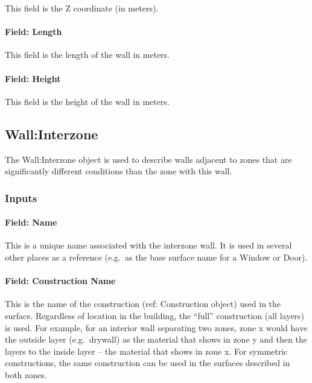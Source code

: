 This field is the Z coordinate (in meters).

\paragraph{Field: Length}\label{field-length-2}

This field is the length of the wall in meters.

\paragraph{Field: Height}\label{field-height-2}

This field is the height of the wall in meters.

\subsection{Wall:Interzone}\label{wallinterzone}

The Wall:Interzone object is used to describe walls adjacent to zones that are significantly different conditions than the zone with this wall.

\subsubsection{Inputs}\label{inputs-7-028}

\paragraph{Field: Name}\label{field-name-3-033}

This is a unique name associated with the interzone wall. It is used in several other places as a reference (e.g.~as the base surface name for a Window or Door).

\paragraph{Field: Construction Name}\label{field-construction-name-3}

This is the name of the construction (ref: Construction object) used in the surface. Regardless of location in the building, the ``full'' construction (all layers) is used. For example, for an interior wall separating two zones, zone x would have the outside layer (e.g.~drywall) as the material that shows in zone y and then the layers to the inside layer -- the material that shows in zone x. For symmetric constructions, the same construction can be used in the surfaces described in both zones.

